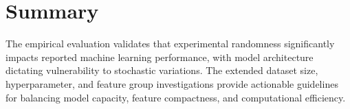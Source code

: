 \section{Summary}
\label{sec:results_summary}

The empirical evaluation validates that experimental randomness significantly impacts reported machine learning performance, with model architecture dictating vulnerability to stochastic variations. The extended dataset size, hyperparameter, and feature group investigations provide actionable guidelines for balancing model capacity, feature compactness, and computational efficiency.
